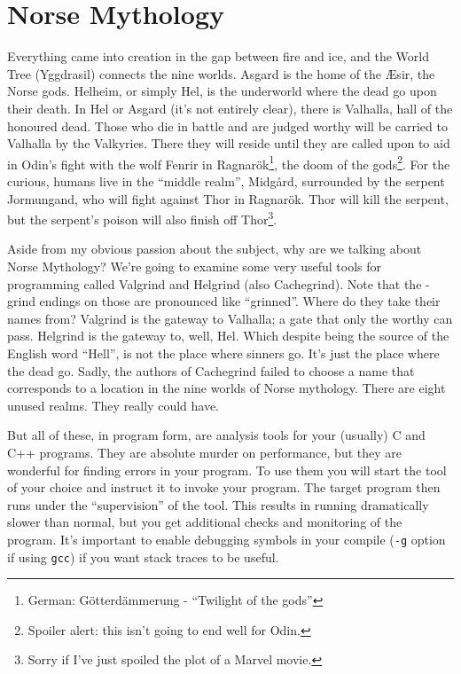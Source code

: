 




\section*{Norse Mythology}
Everything came into creation in the gap between fire and ice, and the World Tree (Yggdrasil) connects the nine worlds. Asgard is the home of the \AE sir, the Norse gods. Helheim, or simply Hel, is the underworld where the dead go upon their death. In Hel or Asgard (it's not entirely clear), there is Valhalla, hall of the honoured dead. Those who die in battle and are judged worthy will be carried to Valhalla by the Valkyries. There they will reside until they are called upon to aid in Odin's fight with the wolf Fenrir in Ragnar\"ok\footnote{German: G\"otterd\"ammerung - ``Twilight of the gods''}, the doom of the gods\footnote{Spoiler alert: this isn't going to end well for Odin.}. For the curious, humans live in the ``middle realm'', Midg\aa rd, surrounded by the serpent Jormungand, who will fight against Thor in  Ragnar\"ok. Thor will kill the serpent, but the serpent's poison will also finish off Thor\footnote{Sorry if I've just spoiled the plot of a Marvel movie.}.

Aside from my obvious passion about the subject, why are we talking about Norse Mythology? We're going to examine some very useful tools for programming called Valgrind and Helgrind (also Cachegrind). Note that the -grind endings on those are pronounced like ``grinned''. Where do they take their names from? Valgrind is the gateway to Valhalla; a gate that only the worthy can pass. Helgrind is the gateway to, well, Hel. Which despite being the source of the English word ``Hell'', is not the place where sinners go. It's just the place where the dead go. Sadly, the authors of Cachegrind failed to choose a name that corresponds to a location in the nine worlds of Norse mythology. There are eight unused realms. They really could have.

But all of these, in program form, are analysis tools for your (usually) C and C++ programs. They are absolute murder on performance, but they are wonderful for finding errors in your program. To use them you will start the tool of your choice and instruct it to invoke your program. The target program then runs under the ``supervision'' of the tool. This results in running dramatically slower than normal, but you get additional checks and monitoring of the program. It's important to enable debugging symbols in your compile (\texttt{-g} option if using \texttt{gcc}) if you want stack traces to be useful.

